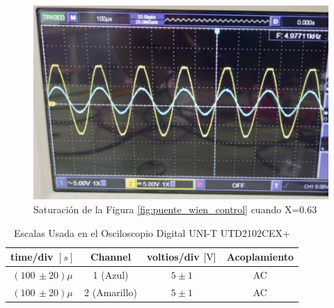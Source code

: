             \begin{figure}[H]
                \centering
                \renewcommand{\figurename}{Imagen}
                \includegraphics[width=15cm]{Imagenes/exp_puente_wien_sc63.png}
                \caption{Saturación de la Figura \ref{fig:puente_wien_control} cuando X=0.63}
                \label{fig:exp_puente_wien_sc63}
            \end{figure}

            \begin{table}[H]
                \centering
                \begin{tabular}{|c|c|c|c|}
                    \hline
                    \textbf{time/div} $[s]$ & \textbf{Channel} & \textbf{voltios/div $[\volt]$} & \textbf{Acoplamiento} \\ \hline
                    $(100 \, \pm 20) \mu  $ & 1 (Azul)  &   $5 \pm 1 $ & AC \\ \hline  
                    $(100 \, \pm 20) \mu  $ & 2 (Amarillo)  &   $5 \pm 1 $ & AC \\ \hline 
                \end{tabular}
                \caption{Escalas Usada en el Osciloscopio Digital UNI-T UTD2102CEX+}
                \label{tab:escala_puente_wien_sc63}
            \end{table}


